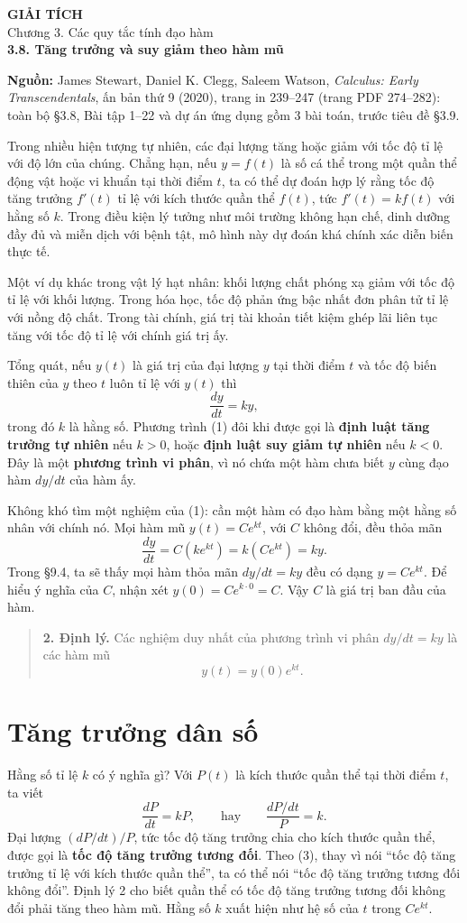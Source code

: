 \documentclass[12pt,a4paper]{article}
\begin{document}
\begin{center}
{\Large\bfseries GIẢI TÍCH}\\[5pt]
{\large Chương 3. Các quy tắc tính đạo hàm}\\[9pt]
{\Large\bfseries 3.8. Tăng trưởng và suy giảm theo hàm mũ}
\end{center}
\noindent\textbf{Nguồn:} James Stewart, Daniel K. Clegg, Saleem Watson, \textit{Calculus: Early Transcendentals}, ấn bản thứ 9 (2020), trang in 239–247 (trang PDF 274–282): toàn bộ §3.8, Bài tập 1–22 và dự án ứng dụng gồm 3 bài toán, trước tiêu đề §3.9.

Trong nhiều hiện tượng tự nhiên, các đại lượng tăng hoặc giảm với tốc độ tỉ lệ với độ lớn của chúng. Chẳng hạn, nếu $y=f(t)$ là số cá thể trong một quần thể động vật hoặc vi khuẩn tại thời điểm $t$, ta có thể dự đoán hợp lý rằng tốc độ tăng trưởng $f'(t)$ tỉ lệ với kích thước quần thể $f(t)$, tức $f'(t)=kf(t)$ với hằng số $k$. Trong điều kiện lý tưởng như môi trường không hạn chế, dinh dưỡng đầy đủ và miễn dịch với bệnh tật, mô hình này dự đoán khá chính xác diễn biến thực tế.

Một ví dụ khác trong vật lý hạt nhân: khối lượng chất phóng xạ giảm với tốc độ tỉ lệ với khối lượng. Trong hóa học, tốc độ phản ứng bậc nhất đơn phân tử tỉ lệ với nồng độ chất. Trong tài chính, giá trị tài khoản tiết kiệm ghép lãi liên tục tăng với tốc độ tỉ lệ với chính giá trị ấy.

Tổng quát, nếu $y(t)$ là giá trị của đại lượng $y$ tại thời điểm $t$ và tốc độ biến thiên của $y$ theo $t$ luôn tỉ lệ với $y(t)$ thì
\[\frac{dy}{dt}=ky,\tag{1}\]
trong đó $k$ là hằng số. Phương trình (1) đôi khi được gọi là \textbf{định luật tăng trưởng tự nhiên} nếu $k>0$, hoặc \textbf{định luật suy giảm tự nhiên} nếu $k<0$. Đây là một \textbf{phương trình vi phân}, vì nó chứa một hàm chưa biết $y$ cùng đạo hàm $dy/dt$ của hàm ấy.

Không khó tìm một nghiệm của (1): cần một hàm có đạo hàm bằng một hằng số nhân với chính nó. Mọi hàm mũ $y(t)=Ce^{kt}$, với $C$ không đổi, đều thỏa mãn
\[\frac{dy}{dt}=C(ke^{kt})=k(Ce^{kt})=ky.\]
Trong §9.4, ta sẽ thấy mọi hàm thỏa mãn $dy/dt=ky$ đều có dạng $y=Ce^{kt}$. Để hiểu ý nghĩa của $C$, nhận xét $y(0)=Ce^{k\cdot0}=C$. Vậy $C$ là giá trị ban đầu của hàm.
\begin{quote}\textbf{2. Định lý.} Các nghiệm duy nhất của phương trình vi phân $dy/dt=ky$ là các hàm mũ
\[y(t)=y(0)e^{kt}.\]
\end{quote}
\section*{Tăng trưởng dân số}
Hằng số tỉ lệ $k$ có ý nghĩa gì? Với $P(t)$ là kích thước quần thể tại thời điểm $t$, ta viết
\[\frac{dP}{dt}=kP,\qquad\text{hay}\qquad\frac{dP/dt}{P}=k.\tag{3}\]
Đại lượng $(dP/dt)/P$, tức tốc độ tăng trưởng chia cho kích thước quần thể, được gọi là \textbf{tốc độ tăng trưởng tương đối}. Theo (3), thay vì nói “tốc độ tăng trưởng tỉ lệ với kích thước quần thể”, ta có thể nói “tốc độ tăng trưởng tương đối không đổi”. Định lý 2 cho biết quần thể có tốc độ tăng trưởng tương đối không đổi phải tăng theo hàm mũ. Hằng số $k$ xuất hiện như hệ số của $t$ trong $Ce^{kt}$.
\end{document}
